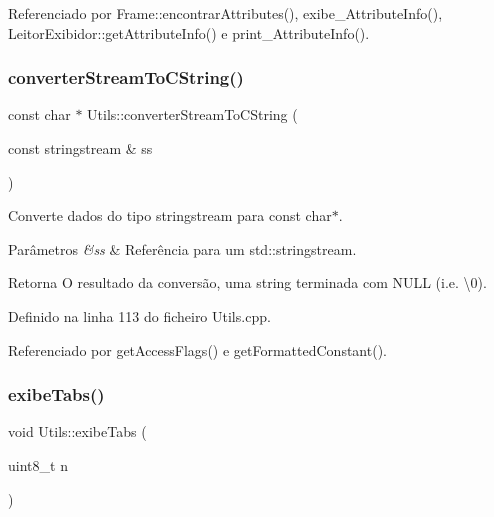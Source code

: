 Referenciado por Frame\+::encontrar\+Attributes(), exibe\+\_\+\+Attribute\+Info(), Leitor\+Exibidor\+::get\+Attribute\+Info() e print\+\_\+\+Attribute\+Info().

\mbox{\label{classUtils_abef6742f09f81fea5952454925325ea5}} 
\subsubsection{\texorpdfstring{converter\+Stream\+To\+C\+String()}{converterStreamToCString()}}
{\footnotesize\ttfamily const char $\ast$ Utils\+::converter\+Stream\+To\+C\+String (\begin{DoxyParamCaption}\item[{const stringstream \&}]{ss }\end{DoxyParamCaption})\hspace{0.3cm}{\ttfamily [static]}}

Converte dados do tipo stringstream para {\ttfamily const} {\ttfamily char$\ast$}. 
\begin{DoxyParams}{Parâmetros}
{\em \&ss} & Referência para um {\ttfamily std\+::stringstream}. \\
\hline
\end{DoxyParams}
\begin{DoxyReturn}{Retorna}
O resultado da conversão, uma string terminada com N\+U\+LL (i.\+e. \textbackslash{}0). 
\end{DoxyReturn}


Definido na linha 113 do ficheiro Utils.\+cpp.



Referenciado por get\+Access\+Flags() e get\+Formatted\+Constant().

\mbox{\label{classUtils_a2a13f135d652b68fae6f4b8a9b21464e}} 
\subsubsection{\texorpdfstring{exibe\+Tabs()}{exibeTabs()}\hspace{0.1cm}{\footnotesize\ttfamily [1/2]}}
{\footnotesize\ttfamily void Utils\+::exibe\+Tabs (\begin{DoxyParamCaption}\item[{uint8\+\_\+t}]{n }\end{DoxyParamCaption})\hspace{0.3cm}{\ttfamily [static]}}

